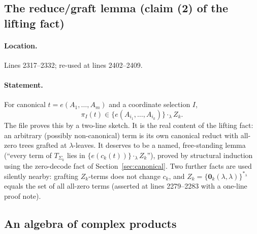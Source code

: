 \documentclass[11pt]{article}
\newcommand{\Term}[1]{T_{#1}}
\begin{document}
\subsection{The reduce/graft lemma (claim (2) of the lifting fact)}

\paragraph{Location.} Lines 2317--2332; re-used at lines 2402--2409.

\paragraph{Statement.} For canonical \(t=e(A_1,\ldots,A_m)\) and a coordinate
selection \(I\),
\[
  \pi_I(t)\in\{e(A_{i_1},\ldots,A_{i_k})\}\cdot_\lambda Z_k .
\]
The file proves this by a two-line sketch.  It is the real content of the
lifting fact: an arbitrary (possibly non-canonical) term is its own canonical
reduct with all-zero trees grafted at \(\lambda\)-leaves.  It deserves to be a
named, free-standing lemma (``every term of \(\Term{\Sigma_k}\) lies in
\(\{e(c_k(t))\}\cdot_\lambda Z_k\)''), proved by structural induction using the
zero-decode fact of Section~\ref{sec:canonical}.  Two further facts are used
silently nearby: grafting \(Z_k\)-terms does not change \(c_k\), and
\(Z_k=\{\mathbf 0_k(\lambda,\lambda)\}^{*_\lambda}\) equals the set of all
all-zero terms (asserted at lines 2279--2283 with a one-line proof note).

\subsection{An algebra of complex products}
\end{document}

